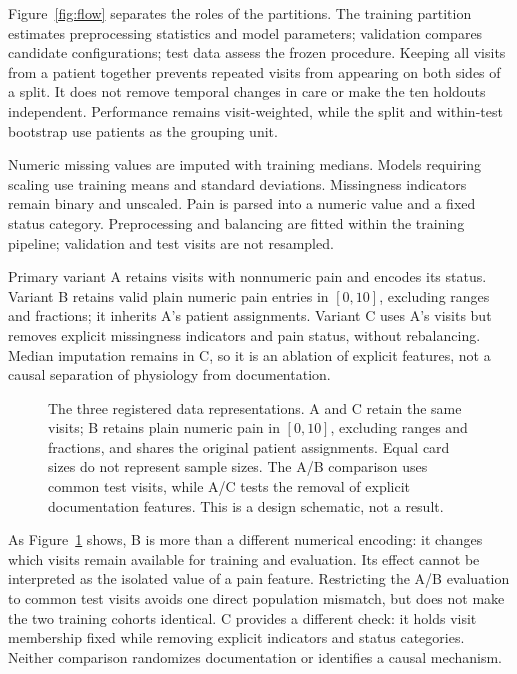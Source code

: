 Figure~\ref{fig:flow} separates the roles of the partitions. The training
partition estimates preprocessing statistics and model parameters;
validation compares candidate configurations; test data assess the frozen
procedure. Keeping all visits from a patient together prevents repeated
visits from appearing on both sides of a split. It does not remove temporal
changes in care or make the ten holdouts independent. Performance remains
visit-weighted, while the split and within-test bootstrap use patients as
the grouping unit.

Numeric missing values are imputed with training medians. Models requiring
scaling use training means and standard deviations. Missingness indicators
remain binary and unscaled. Pain is parsed into a numeric value and a fixed
status category. Preprocessing and balancing are fitted within the training
pipeline; validation and test visits are not resampled.

Primary variant A retains visits with nonnumeric pain and encodes its status.
Variant B retains valid plain numeric pain entries in $[0,10]$, excluding
ranges and fractions; it inherits A's patient assignments. Variant C uses A's visits but removes
explicit missingness indicators and pain status, without rebalancing. Median
imputation remains in C, so it is an ablation of explicit features, not a
causal separation of physiology from documentation.

\begin{figure}[t]
\centering

\caption{The three registered data representations. A and C retain the same
visits; B retains plain numeric pain in $[0,10]$, excluding ranges and fractions, and shares the original
patient assignments. Equal card sizes do not represent sample sizes. The
A/B comparison uses common test visits, while A/C tests the removal of
explicit documentation features. This is a design schematic, not a result.}
\label{fig:variants}
\end{figure}

As Figure~\ref{fig:variants} shows, B is more than a different numerical
encoding: it changes which visits remain available for training and
evaluation. Its effect cannot be interpreted as the isolated value of a
pain feature. Restricting the A/B evaluation to common test visits avoids
one direct population mismatch, but does not make the two training cohorts
identical. C provides a different check: it holds visit membership fixed
while removing explicit indicators and status categories. Neither
comparison randomizes documentation or identifies a causal mechanism.

